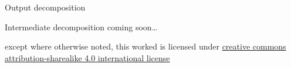 \documentclass[10pt, t]{beamer}
\begin{document}
  \begin{frame}{Output decomposition}
  \end{frame}


  \begin{frame}{Intermediate decomposition}
    coming soon\dots
  \end{frame}


  \appendix

  \begin{frame}[c]
    \begin{center}\ccbysa\end{center}

    except where otherwise noted, this worked is licensed under
    \href{http://creativecommons.org/licenses/by-sa/4.0/}{creative commons
    attribution-sharealike 4.0 international license}
  \end{frame}
\end{document}
